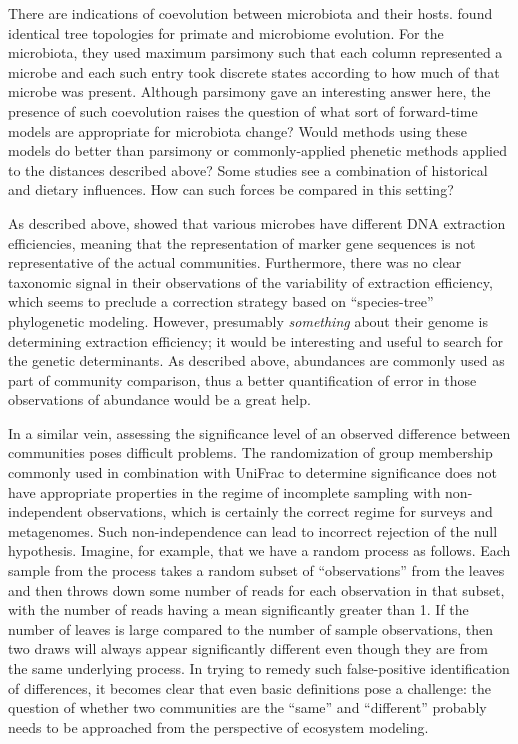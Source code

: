 \documentclass{amsart}
\begin{document}
There are indications of coevolution between microbiota and their hosts.
\citet{ochman2010evolutionary} found identical tree topologies for primate and microbiome evolution.
For the microbiota, they used maximum parsimony such that each column represented a microbe and each such entry took discrete states according to how much of that microbe was present.
Although parsimony gave an interesting answer here, the presence of such coevolution raises the question of what sort of forward-time models are appropriate for microbiota change?
Would methods using these models do better than parsimony or commonly-applied phenetic methods applied to the distances described above?
Some studies \citep[e.g.][]{phillips2012microbiome,delsuc2013convergence} see a combination of historical and dietary influences.
How can such forces be compared in this setting?

As described above, \citet{morgan2010metagenomic} showed that various microbes have different DNA extraction efficiencies, meaning that the representation of marker gene sequences is not representative of the actual communities.
Furthermore, there was no clear taxonomic signal in their observations of the variability of extraction efficiency, which seems to preclude a correction strategy based on ``species-tree'' phylogenetic modeling.
However, presumably \textit{something} about their genome is determining extraction efficiency; it would be interesting and useful to search for the genetic determinants.
As described above, abundances are commonly used as part of community comparison, thus a better quantification of error in those observations of abundance would be a great help.

In a similar vein, assessing the significance level of an observed difference between communities poses difficult problems.
The randomization of group membership commonly used in combination with UniFrac to determine significance does not have appropriate properties in the regime of incomplete sampling with non-independent observations, which is certainly the correct regime for surveys and metagenomes.
Such non-independence can lead to incorrect rejection of the null hypothesis.
Imagine, for example, that we have a random process as follows.
Each sample from the process takes a random subset of ``observations'' from the leaves and then throws down some number of reads for each observation in that subset, with the number of reads having a mean significantly greater than 1.
If the number of leaves is large compared to the number of sample observations, then two draws will always appear significantly different even though they are from the same underlying process.
In trying to remedy such false-positive identification of differences, it becomes clear that even basic definitions pose a challenge: the question of whether two communities are the ``same'' and ``different'' probably needs to be approached from the perspective of ecosystem modeling.
\end{document}
